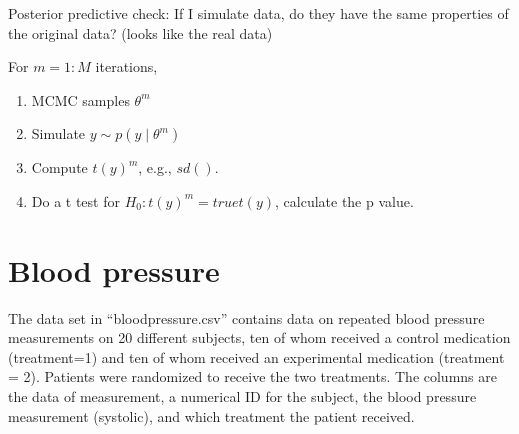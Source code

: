 \documentclass[11pt]{article}
\begin{document}
\begin{enumerate}[(A)]
Posterior predictive check: If I simulate data, do they have the same properties of the original data? (looks like the real data)

For $m=1:M$ iterations,
\begin{enumerate}
    \item MCMC samples $\theta^m$
    \item Simulate $y \sim p(y \mid \theta^m)$
    \item Compute $t(y)^m$, e.g., $sd()$.
    \item Do a t test for $H_0: t(y)^m = true t(y)$, calculate the p value.
\end{enumerate}

\end{enumerate}


\section{Blood pressure}

The data set in ``bloodpressure.csv'' contains data on repeated blood pressure measurements on 20 different subjects, ten of whom received a control medication (treatment=1) and ten of whom received an experimental medication (treatment = 2).  Patients were randomized to receive the two treatments.  The columns are the data of measurement, a numerical ID for the subject, the blood pressure measurement (systolic), and which treatment the patient received.
\end{document}
